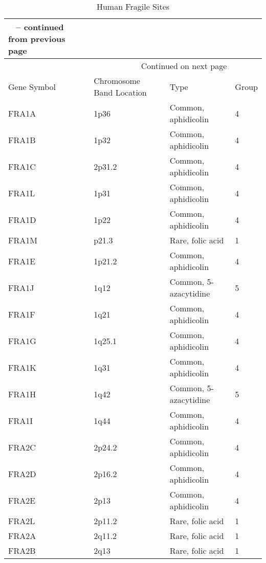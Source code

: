 \documentclass[phd,tocprelim]{cornell}
\begin{document}
\begin{center}
  \begin{longtable}{|l|l|l|l|}
    \caption[Human Fragile Sites]{Human Fragile Sites
    } \label{grid_hfs} \\ \hline

    \endfirsthead
    {{\bfseries \tablename\ \thetable{} -- continued from previous page}} \\ \hline
    \endhead

    \hline \multicolumn{3}{|r|}{{Continued on next page}} \\ \hline
    \endfoot

    \hline \hline
    \endlastfoot

     Gene Symbol & Chromosome Band Location & Type & Group \\ \hline
     FRA1A  & 1p36     & Common, aphidicolin   & 4 \\
     FRA1B  & 1p32     & Common, aphidicolin   & 4 \\
     FRA1C  & 2p31.2   & Common, aphidicolin   & 4 \\
     FRA1L  & 1p31     & Common, aphidicolin   & 4 \\
     FRA1D  & 1p22     & Common, aphidicolin   & 4 \\
     FRA1M  & p21.3    & Rare, folic acid    & 1 \\
     FRA1E  & 1p21.2   & Common, aphidicolin   & 4 \\
     FRA1J  & 1q12     & Common, 5-azacytidine & 5 \\
     FRA1F  & 1q21     & Common, aphidicolin   & 4 \\
     FRA1G  & 1q25.1   & Common, aphidicolin   & 4 \\
     FRA1K  & 1q31     & Common, aphidicolin   & 4 \\
     FRA1H  & 1q42     & Common, 5-azacytidine & 5 \\
     FRA1I  & 1q44     & Common, aphidicolin   & 4 \\
     FRA2C  & 2p24.2   & Common, aphidicolin   & 4 \\
     FRA2D  & 2p16.2   & Common, aphidicolin   & 4 \\
     FRA2E  & 2p13     & Common, aphidicolin   & 4 \\
     FRA2L  & 2p11.2   & Rare, folic acid    & 1 \\
     FRA2A  & 2q11.2   & Rare, folic acid    & 1 \\
     FRA2B  & 2q13     & Rare, folic acid    & 1 \\

\end{longtable}
\end{center}
\end{document}
